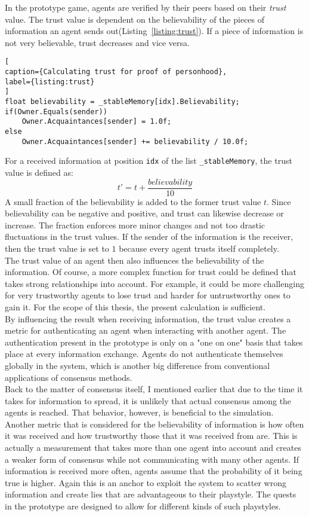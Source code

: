 In the prototype game, agents are verified by their peers based on their \textit{trust} value. The trust value is dependent on the believability of the pieces of information an agent sends out(Listing~\ref{listing:trust}). If a piece of information is not very believable, trust decreases and vice versa.
\begin{lstlisting}[
caption={Calculating trust for proof of personhood},
label={listing:trust}
]
float believability = _stableMemory[idx].Believability;
if(Owner.Equals(sender))
	Owner.Acquaintances[sender] = 1.0f;
else
	Owner.Acquaintances[sender] += believability / 10.0f;
\end{lstlisting}
For a received information at position \verb|idx| of the list \verb|_stableMemory|, the trust value is defined as:
\begin{equation*}
t' = t + \frac{believability}{10}
\end{equation*}
A small fraction of the believability is added to the former trust value $t$. Since believability can be negative and positive, and trust can likewise decrease or increase. The fraction enforces more minor changes and not too drastic fluctuations in the trust values. If the sender of the information is the receiver, then the trust value is set to $1$ because every agent trusts itself completely.\\
The trust value of an agent then also influences the believability of the information. Of course, a more complex function for trust could be defined that takes strong relationships into account. For example, it could be more challenging for very trustworthy agents to lose trust and harder for untrustworthy ones to gain it. For the scope of this thesis, the present calculation is sufficient.\\
By influencing the result when receiving information, the trust value creates a metric for authenticating an agent when interacting with another agent. The authentication present in the prototype is only on a "one on one" basis that takes place at every information exchange. Agents do not authenticate themselves globally in the system, which is another big difference from conventional applications of consensus methods.\\
Back to the matter of consensus itself, I mentioned earlier that due to the time it takes for information to spread, it is unlikely that actual consensus among the agents is reached. That behavior, however, is beneficial to the simulation.\\
Another metric that is considered for the believability of information is how often it was received and how trustworthy those that it was received from are. This is actually a measurement that takes more than one agent into account and creates a weaker form of consensus while not communicating with many other agents. If information is received more often, agents assume that the probability of it being true is higher. Again this is an anchor to exploit the system to scatter wrong information and create lies that are advantageous to their playstyle. The quests in the prototype are designed to allow for different kinds of such playstyles.
